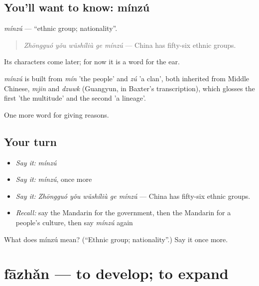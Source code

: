 \subsection*{You'll want to know: mínzú}
\emph{mínzú} — \textquotedblleft{}ethnic group; nationality\textquotedblright{}.

\begin{quote}
\emph{Zhōngguó yǒu wǔshíliù ge mínzú} — China has fifty-six ethnic groups.
\end{quote}

Its characters come later; for now it is a word for the ear.

\begin{cousinweb}
\emph{mínzú} is built from \emph{mín} 'the people' and \emph{zú} 'a clan', both inherited from Middle Chinese, \emph{mjin} and \emph{dzuwk} (Guangyun, in Baxter's transcription), which glosses the first 'the multitude' and the second 'a lineage'.
\end{cousinweb}

\begin{grammarlens}[title={What you've built}]
One more word for giving reasons.
\end{grammarlens}

\subsection*{Your turn}
\begin{itemize}
\raggedright
  \item \emph{Say it:} \emph{mínzú}
  \item \emph{Say it:} \emph{mínzú}, once more
  \item \emph{Say it:} \emph{Zhōngguó yǒu wǔshíliù ge mínzú} — China has fifty-six ethnic groups.
  \item \emph{Recall:} say the Mandarin for the government, then the Mandarin for a people's culture, then say \emph{mínzú} again
\end{itemize}

\begin{tcolorbox}[breakable,colback=teal!4,colframe=teal!35!black,title={Before you move on}]
What does mínzú mean? (\textquotedblleft{}Ethnic group; nationality\textquotedblright{}.) Say it once more.
\end{tcolorbox}
\section[fāzhǎn]{fāzhǎn — to develop; to expand}

